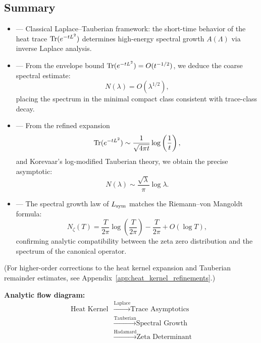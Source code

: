 \subsection*{Summary}

\begin{itemize}
  \item {} — Classical Laplace–Tauberian framework: the short-time behavior of the heat trace \( \operatorname{Tr}(e^{-tL^2}) \) determines high-energy spectral growth \( A(\Lambda) \) via inverse Laplace analysis.

  \item {} — From the envelope bound \( \operatorname{Tr}(e^{-t L^2}) = O(t^{-1/2}) \), we deduce the coarse spectral estimate:
  \[
  N(\lambda) = O(\lambda^{1/2}),
  \]
  placing the spectrum in the minimal compact class consistent with trace-class decay.

  \item {} — From the refined expansion
  \[
  \operatorname{Tr}(e^{-t L^2}) \sim \frac{1}{\sqrt{4\pi t}} \log\left( \frac{1}{t} \right),
  \]
  and Korevaar’s log-modified Tauberian theory, we obtain the precise asymptotic:
  \[
  N(\lambda) \sim \frac{\sqrt{\lambda}}{\pi} \log \lambda.
  \]

  \item {} — The spectral growth law of \( L_{\mathrm{sym}} \) matches the Riemann–von Mangoldt formula:
  \[
  N_\zeta(T) = \frac{T}{2\pi} \log\left( \frac{T}{2\pi} \right) - \frac{T}{2\pi} + O(\log T),
  \]
  confirming analytic compatibility between the zeta zero distribution and the spectrum of the canonical operator.
\end{itemize}

\medskip
\noindent
(For higher-order corrections to the heat kernel expansion and Tauberian remainder estimates, see Appendix~\ref{app:heat_kernel_refinements}.)

\vspace{0.5em}

\noindent\textbf{Analytic flow diagram:}
\[
\begin{aligned}
\text{Heat Kernel}
&\xrightarrow{\text{Laplace}} \text{Trace Asymptotics} \\
&\xrightarrow{\text{Tauberian}} \text{Spectral Growth} \\
&\xrightarrow{\text{Hadamard}} \text{Zeta Determinant}
\end{aligned}
\]

